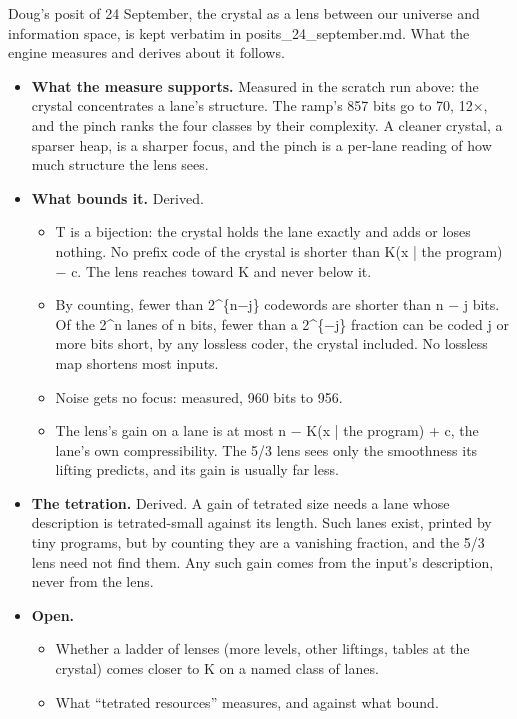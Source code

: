 Doug's posit of 24 September, the crystal as a lens between our universe and information space, is kept verbatim in posits\_\allowbreak{}24\_\allowbreak{}september.md. What the engine measures and derives about it follows.

\begin{itemize}
\item \textbf{What the measure supports.} Measured in the scratch run above: the crystal concentrates a lane's structure. The ramp's 857 bits go to 70, 12×, and the pinch ranks the four classes by their complexity. A cleaner crystal, a sparser heap, is a sharper focus, and the pinch is a per-lane reading of how much structure the lens sees.
\item \textbf{What bounds it.} Derived.

\begin{itemize}
\item T is a bijection: the crystal holds the lane exactly and adds or loses nothing. No prefix code of the crystal is shorter than K(x | the program) − c. The lens reaches toward K and never below it.
\item By counting, fewer than 2\textasciicircum{}\{n−j\} codewords are shorter than n − j bits. Of the 2\textasciicircum{}n lanes of n bits, fewer than a 2\textasciicircum{}\{−j\} fraction can be coded j or more bits short, by any lossless coder, the crystal included. No lossless map shortens most inputs.
\item Noise gets no focus: measured, 960 bits to 956.
\item The lens's gain on a lane is at most n − K(x | the program) + c, the lane's own compressibility. The 5/3 lens sees only the smoothness its lifting predicts, and its gain is usually far less.
\end{itemize}
\item \textbf{The tetration.} Derived. A gain of tetrated size needs a lane whose description is tetrated-small against its length. Such lanes exist, printed by tiny programs, but by counting they are a vanishing fraction, and the 5/3 lens need not find them. Any such gain comes from the input's description, never from the lens.
\item \textbf{Open.}

\begin{itemize}
\item Whether a ladder of lenses (more levels, other liftings, tables at the crystal) comes closer to K on a named class of lanes.
\item What “tetrated resources” measures, and against what bound.
\end{itemize}
\end{itemize}

